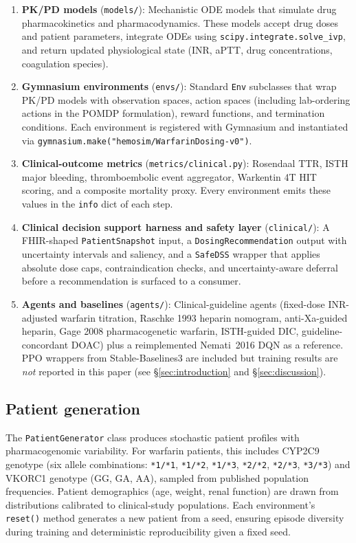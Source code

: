 \documentclass[11pt]{article}
\begin{document}
\begin{enumerate}
  \item \textbf{PK/PD models} (\texttt{models/}): Mechanistic ODE models that simulate drug pharmacokinetics and pharmacodynamics. These models accept drug doses and patient parameters, integrate ODEs using \texttt{scipy.integrate.solve\_ivp}, and return updated physiological state (INR, aPTT, drug concentrations, coagulation species).
  \item \textbf{Gymnasium environments} (\texttt{envs/}): Standard \texttt{Env} subclasses that wrap PK/PD models with observation spaces, action spaces (including lab-ordering actions in the POMDP formulation), reward functions, and termination conditions. Each environment is registered with Gymnasium and instantiated via \texttt{gymnasium.make("hemosim/WarfarinDosing-v0")}.
  \item \textbf{Clinical-outcome metrics} (\texttt{metrics/clinical.py}): Rosendaal TTR, ISTH major bleeding, thromboembolic event aggregator, Warkentin 4T HIT scoring, and a composite mortality proxy. Every environment emits these values in the \texttt{info} dict of each step.
  \item \textbf{Clinical decision support harness and safety layer} (\texttt{clinical/}): A FHIR-shaped \texttt{PatientSnapshot} input, a \texttt{DosingRecommendation} output with uncertainty intervals and saliency, and a \texttt{SafeDSS} wrapper that applies absolute dose caps, contraindication checks, and uncertainty-aware deferral before a recommendation is surfaced to a consumer.
  \item \textbf{Agents and baselines} (\texttt{agents/}): Clinical-guideline agents (fixed-dose INR-adjusted warfarin titration, Raschke 1993 heparin nomogram, anti-Xa-guided heparin, Gage 2008 pharmacogenetic warfarin, ISTH-guided DIC, guideline-concordant DOAC) plus a reimplemented Nemati~2016 DQN as a reference. PPO wrappers from Stable-Baselines3 \citep{stablebaselines3, schulman2017ppo} are included but training results are \emph{not} reported in this paper (see \S\ref{sec:introduction} and \S\ref{sec:discussion}).
\end{enumerate}

\subsection{Patient generation}

The \texttt{PatientGenerator} class produces stochastic patient profiles with pharmacogenomic variability. For warfarin patients, this includes CYP2C9 genotype (six allele combinations: \texttt{*1/*1}, \texttt{*1/*2}, \texttt{*1/*3}, \texttt{*2/*2}, \texttt{*2/*3}, \texttt{*3/*3}) and VKORC1 genotype (GG, GA, AA), sampled from published population frequencies. Patient demographics (age, weight, renal function) are drawn from distributions calibrated to clinical-study populations. Each environment's \texttt{reset()} method generates a new patient from a seed, ensuring episode diversity during training and deterministic reproducibility given a fixed seed.
\end{document}
